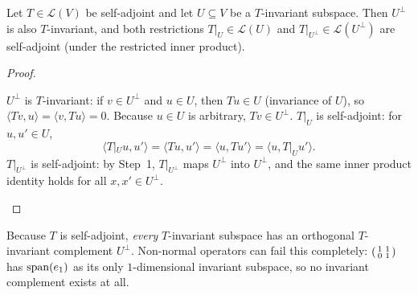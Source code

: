 \documentclass[10pt]{scrartcl}
\newcommand{\LL}{\mathcal L}\newcommand{\PP}{\mathcal P}\newcommand{\MM}{\mathcal M}
\begin{document}
\begin{theorem*}
  Let $T\in\LL(V)$ be self-adjoint and let $U\subseteq V$ be a $T$-invariant subspace. Then $U^\perp$ is also $T$-invariant, and both restrictions $T|_U\in\LL(U)$ and $T|_{U^\perp}\in\LL(U^\perp)$ are self-adjoint (under the restricted inner product).
\end{theorem*}
\begin{proof}
  \begin{steps}
    \ii $U^\perp$ is $T$-invariant: if $v\in U^\perp$ and $u\in U$, then $Tu\in U$ (invariance of $U$), so $\langle Tv,u\rangle=\langle v,Tu\rangle=0$. Because $u\in U$ is arbitrary, $Tv\in U^\perp$.
    \ii $T|_U$ is self-adjoint: for $u,u'\in U$,
    \[ \langle T|_U u,u'\rangle=\langle Tu,u'\rangle=\langle u,Tu'\rangle=\langle u,T|_U u'\rangle. \]
    \ii $T|_{U^\perp}$ is self-adjoint: by Step~1, $T|_{U^\perp}$ maps $U^\perp$ into $U^\perp$, and the same inner product identity holds for all $x,x'\in U^\perp$.
  \end{steps}
\end{proof}

Because $T$ is self-adjoint, \emph{every} $T$-invariant subspace has an orthogonal $T$-invariant complement $U^\perp$. Non-normal operators can fail this completely: $\begin{psmallmatrix}1&1\\0&1\end{psmallmatrix}$ has $\operatorname{span}(e_1)$ as its only $1$-dimensional invariant subspace, so no invariant complement exists at all.
\end{document}
